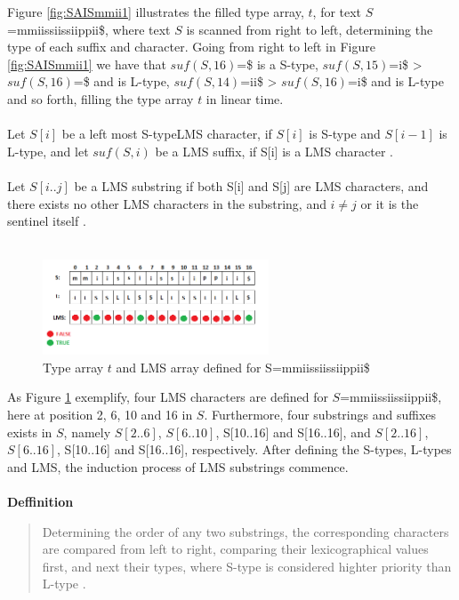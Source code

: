 \documentclass[12pt]{article} %
\begin{document}
Figure \ref{fig:SAISmmii1} illustrates the filled type array, $t$, for text $S$=mmiissiissiippii\$, where text $S$ is scanned from right to left, determining the type of each suffix and character. Going from right to left in Figure \ref{fig:SAISmmii1} we have that $suf(S,16)$=\$ is a S-type, $suf(S,15)$=i\$ > $suf(S,16)$=\$ and is L-type, $suf(S,14)$=ii\$ > $suf(S,16)$=i\$ and is L-type and so forth, filling the type array $t$ in linear time.
\\ \\
Let $S[i]$ be a left most S-typeLMS character, if $S[i]$ is S-type and $S[i-1]$ is L-type, and let $suf(S,i)$ be a LMS suffix, if S[i] is a LMS character \cite{twoeffecient}.
\\ \\
Let $S[i..j]$ be a LMS substring if both S[i] and S[j] are LMS characters, and there exists no other LMS characters in the substring, and $i \neq j$ or it is the sentinel itself \cite{twoeffecient}.
\\ \\

\begin{figure}[H]
    \centering
    \includegraphics[width=0.6\textwidth]{SAISmmii2}
    \captionsetup{width=0.8\textwidth}
    \caption{Type array $t$ and LMS array defined for S=mmiissiissiippii\$}
    \label{fig:SAISmmii2}
\end{figure}

As Figure \ref{fig:SAISmmii2} exemplify, four LMS characters are defined for $S$=mmiissiissiippii\$, here at position 2, 6, 10 and 16 in $S$. Furthermore, four substrings and suffixes exists in $S$, namely $S[2..6]$, $S[6..10]$, S[10..16] and S[16..16], and $S[2..16]$, $S[6..16]$, S[10..16] and S[16..16], respectively.
After defining the S-types, L-types and LMS, the induction process of LMS substrings commence.
\\ \\

\textbf{Deffinition}
\begin{quote}
Determining the order of any two substrings, the corresponding characters are compared from left to right, comparing their lexicographical values first, and next their types, where S-type is considered highter priority than L-type \cite{twoeffecient}.
\end{quote}
\end{document}
